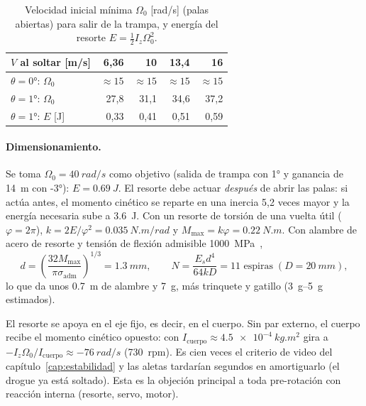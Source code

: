 \begin{table}[H]
\centering
\caption{Velocidad inicial mínima $\Omega_0$ [rad/s] (palas abiertas) para salir de la
trampa, y energía del resorte $E=\tfrac12I_z\Omega_0^2$.}
\label{tab:arranque-om0}
\begin{tabular}{lrrrr}
\toprule
$V$ al soltar [m/s] & 6,36 & 10 & 13,4 & 16 \\
\midrule
$\theta=\ang{0}$: $\Omega_0$ & $\approx15$ & $\approx15$ & $\approx15$ & $\approx15$ \\
$\theta=\ang{+1}$: $\Omega_0$ & 27,8 & 31,1 & 34,6 & 37,2 \\
$\theta=\ang{+1}$: $E$ [J] & 0,33 & 0,41 & 0,51 & 0,59 \\
\bottomrule
\end{tabular}
\end{table}

\paragraph{Dimensionamiento.} Se toma $\Omega_0=\SI{40}{rad/s}$ como objetivo (salida de
trampa con \ang{+1} y ganancia de \SI{14}{m} con \ang{-3}): $E=\SI{0.69}{J}$. El resorte debe
actuar \emph{después} de abrir las palas: si actúa antes, el momento cinético se reparte en una
inercia 5,2 veces mayor y la energía necesaria sube a \SI{3.6}{J}. Con un resorte de
torsión de una vuelta útil ($\varphi=2\pi$), $k=2E/\varphi^2=\SI{0.035}{N.m/rad}$ y
$M_\text{max}=k\varphi=\SI{0.22}{N.m}$. Con alambre de acero de resorte y tensión de flexión
admisible \SI{1000}{MPa}~\cite{budynas2015},
\begin{equation}
  d=\left(\frac{32M_\text{max}}{\pi\sigma_\text{adm}}\right)^{1/3}=\SI{1.3}{mm},\qquad
  N=\frac{E_sd^4}{64kD}=\num{11}\text{ espiras}\;(D=\SI{20}{mm}),
  \label{eq:arranque-resorte}
\end{equation}
lo que da unos \SI{0.7}{m} de alambre y \SI{7}{g}, más trinquete y gatillo (\SIrange{3}{5}{g}
estimados).

\begin{nota}
El resorte se apoya en el eje fijo, es decir, en el cuerpo. Sin par externo, el cuerpo recibe
el momento cinético opuesto: con $I_\text{cuerpo}\approx\SI{4.5e-4}{kg.m^2}$ gira a
$-I_z\Omega_0/I_\text{cuerpo}\approx\SI{-76}{rad/s}$ (\num{730}~rpm). Es cien veces el criterio
de video del capítulo~\ref{cap:estabilidad} y las aletas tardarían segundos en
amortiguarlo (el drogue ya está soltado). Esta es la objeción principal a toda pre-rotación con reacción interna (resorte,
servo, motor).
\end{nota}

